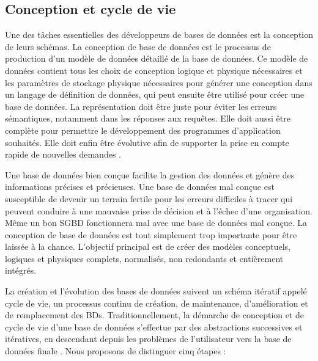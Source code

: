 \subsection{Conception et cycle de vie}

Une des tâches essentielles des développeurs de bases de données est la conception de leurs schémas. La conception de base de données est le processus de production d'un modèle de données détaillé de la base de données. Ce modèle de données contient tous les choix de conception logique et physique nécessaires et les paramètres de stockage physique nécessaires pour générer une conception dans un langage de définition de données, qui peut ensuite être utilisé pour créer une base de données. La représentation doit être juste pour éviter les erreurs sémantiques, notamment dans les réponses aux requêtes. Elle doit aussi être complète pour permettre le développement des programmes d’application souhaités. Elle doit enfin être évolutive afin de supporter la prise en compte rapide de nouvelles demandes \cite{Gardarin03}.

Une base de données bien conçue facilite la gestion des données et génère des informations précises et précieuses. Une base de données mal conçue est susceptible de devenir un terrain fertile pour les erreurs difficiles à tracer qui peuvent conduire à une mauvaise prise de décision et à l'échec d'une organisation. Même un bon SGBD fonctionnera mal avec une base de données mal conçue. La conception de base de données est tout simplement trop importante pour être laissée à la chance. L'objectif principal est de créer des modèles conceptuels, logiques et physiques complets, normalisés, non redondants et entièrement intégrés.

La création et l'évolution des bases de données suivent un schéma itératif appelé cycle de vie, un processus continu de création, de maintenance, d'amélioration et de remplacement des BDs. Traditionnellement, la démarche de conception et de cycle de vie d'une base de données s’effectue par des abstractions successives et itératives, en descendant depuis les problèmes de l’utilisateur vers la base de données finale \cite{Coronel09}. Nous proposons de distinguer cinq étapes :

